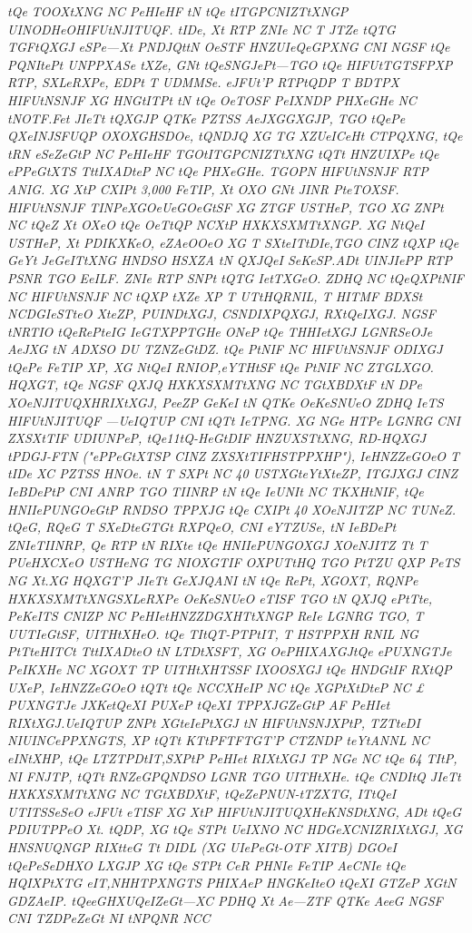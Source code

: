 \documentclass[12pt]{article}
\begin{document}
\textit{tQe TOOXtXNG NC PeHIeHF tN tQe tITGPCNIZTtXNGP UINODHeOHIFUtNJITUQF. tIDe, Xt RTP ZNIe NC T JTZe tQTG TGFtQXGJ eSPe—Xt PNDJQttN OeSTF HNZUIeQeGPXNG CNI NGSF tQe PQNItePt UNPPXASe tXZe, GNt tQeSNGJePt—TGO tQe HIFUtTGTSFPXP RTP, SXLeRXPe, EDPt T UDMMSe. eJFUt'P RTPtQDP T BDTPX HIFUtNSNJF XG HNGtITPt tN tQe OeTOSF PeIXNDP PHXeGHe NC tNOTF.Fet JIeTt tQXGJP QTKe PZTSS AeJXGGXGJP, TGO tQePe QXeINJSFUQP OXOXGHSDOe, tQNDJQ XG TG XZUeICeHt CTPQXNG, tQe tRN eSeZeGtP NC PeHIeHF TGOtITGPCNIZTtXNG tQTt HNZUIXPe tQe ePPeGtXTS TttIXADteP NC tQe PHXeGHe. TGOPN HIFUtNSNJF RTP ANIG. XG XtP CXIPt 3,000 FeTIP, Xt OXO GNt JINR PteTOXSF. HIFUtNSNJF TINPeXGOeUeGOeGtSF XG ZTGF USTHeP, TGO XG ZNPt NC tQeZ Xt OXeO tQe OeTtQP NCXtP HXKXSXMTtXNGP. XG NtQeI USTHeP, Xt PDIKXKeO, eZAeOOeO XG T SXteITtDIe,TGO CINZ tQXP tQe GeYt JeGeITtXNG HNDSO HSXZA tN QXJQeI SeKeSP.ADt UINJIePP RTP PSNR TGO EeILF. ZNIe RTP SNPt tQTG IetTXGeO. ZDHQ NC tQeQXPtNIF NC HIFUtNSNJF NC tQXP tXZe XP T UTtHQRNIL, T HITMF BDXSt NCDGIeSTteO XteZP, PUINDtXGJ, CSNDIXPQXGJ, RXtQeIXGJ. NGSF tNRTIO tQeRePteIG IeGTXPPTGHe ONeP tQe THHIetXGJ LGNRSeOJe AeJXG tN ADXSO DU TZNZeGtDZ. tQe PtNIF NC HIFUtNSNJF ODIXGJ tQePe FeTIP XP, XG NtQeI RNIOP,eYTHtSF tQe PtNIF NC ZTGLXGO. HQXGT, tQe NGSF QXJQ HXKXSXMTtXNG NC TGtXBDXtF tN DPe XOeNJITUQXHRIXtXGJ, PeeZP GeKeI tN QTKe OeKeSNUeO ZDHQ IeTS HIFUtNJITUQF —UeIQTUP CNI tQTt IeTPNG. XG NGe HTPe LGNRG CNI ZXSXtTIF UDIUNPeP, tQe11tQ-HeGtDIF HNZUXSTtXNG, RD-HQXGJ tPDGJ-FTN ("ePPeGtXTSP CINZ ZXSXtTIFHSTPPXHP"), IeHNZZeGOeO T tIDe XC PZTSS HNOe. tN T SXPt NC 40 USTXGteYtXteZP, ITGJXGJ CINZ IeBDePtP CNI ANRP TGO TIINRP tN tQe IeUNIt NC TKXHtNIF, tQe HNIIePUNGOeGtP RNDSO TPPXJG tQe CXIPt 40 XOeNJITZP NC TUNeZ. tQeG, RQeG T SXeDteGTGt RXPQeO, CNI eYTZUSe, tN IeBDePt ZNIeTIINRP, Qe RTP tN RIXte tQe HNIIePUNGOXGJ XOeNJITZ Tt T PUeHXCXeO USTHeNG TG NIOXGTIF OXPUTtHQ TGO PtTZU QXP PeTS NG Xt.XG HQXGT'P JIeTt GeXJQANI tN tQe RePt, XGOXT, RQNPe HXKXSXMTtXNGSXLeRXPe OeKeSNUeO eTISF TGO tN QXJQ ePtTte, PeKeITS CNIZP NC PeHIetHNZZDGXHTtXNGP ReIe LGNRG TGO, T UUTIeGtSF, UITHtXHeO. tQe TItQT-PTPtIT, T HSTPPXH RNIL NG PtTteHITCt TttIXADteO tN LTDtXSFT, XG OePHIXAXGJtQe ePUXNGTJe PeIKXHe NC XGOXT TP UITHtXHTSSF IXOOSXGJ tQe HNDGtIF RXtQP UXeP, IeHNZZeGOeO tQTt tQe NCCXHeIP NC tQe XGPtXtDteP NC £ PUXNGTJe JXKetQeXI PUXeP tQeXI TPPXJGZeGtP AF PeHIet RIXtXGJ.UeIQTUP ZNPt XGteIePtXGJ tN HIFUtNSNJXPtP, TZTteDI NIUINCePPXNGTS, XP tQTt KTtPFTFTGT'P CTZNDP teYtANNL NC eINtXHP, tQe LTZTPDtIT,SXPtP PeHIet RIXtXGJ TP NGe NC tQe 64 TItP, NI FNJTP, tQTt RNZeGPQNDSO LGNR TGO UITHtXHe. tQe CNDItQ JIeTt HXKXSXMTtXNG NC TGtXBDXtF, tQeZePNUN-tTZXTG, ITtQeI UTITSSeSeO eJFUt eTISF XG XtP HIFUtNJITUQXHeKNSDtXNG, ADt tQeG PDIUTPPeO Xt. tQDP, XG tQe STPt UeIXNO NC HDGeXCNIZRIXtXGJ, XG HNSNUQNGP RIXtteG Tt DIDL (XG UIePeGt-OTF XITB) DGOeI tQePeSeDHXO LXGJP XG tQe STPt CeR PHNIe FeTIP AeCNIe tQe HQIXPtXTG eIT,NHHTPXNGTS PHIXAeP HNGKeIteO tQeXI GTZeP XGtN GDZAeIP. tQeeGHXUQeIZeGt—XC PDHQ Xt Ae—ZTF QTKe AeeG NGSF CNI TZDPeZeGt NI tNPQNR NCC
}
\end{document}
